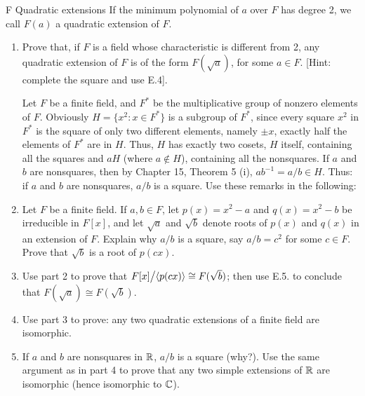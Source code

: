 \begin{exercise}{F Quadratic extensions}
If the minimum polynomial of $a$ over $F$ has degree 2, we call $F(a)$ a quadratic extension of $F$.
\begin{enumerate}
    \item Prove that, if $F$ is a field whose characteristic is different from 2, any quadratic extension of $F$ is of the form $F(\sqrt{a})$, for some $a\in F$. [Hint: complete the square and use E.4].

    Let $F$ be a finite field, and $F^\ast$ be the multiplicative group of nonzero elements of $F$. Obviously $H=\{x^2:x\in F^\ast\}$ is a subgroup of $F^\ast$, since every square $x^2$ in $F^\ast$ is the square of only two different elements, namely $\pm x$, exactly half the elements of $F^\ast$ are in $H$. Thus, $H$ has exactly two cosets, $H$ itself, containing all the squares and $aH$ (where $a\notin H$), containing all the nonsquares. If $a$ and $b$ are nonsquares, then by Chapter 15, Theorem 5 (i), $ab^{-1}=a/b\in H$. Thus: if $a$ and $b$ are nonsquares, $a/b$ is a square. Use these remarks in the following:
    \item Let $F$ be a finite field. If $a,b\in F$, let $p(x)=x^2-a$ and $q(x)=x^2-b$ be irreducible in $F[x]$, and let $\sqrt{a}$ and $\sqrt{b}$ denote roots of $p(x)$ and $q(x)$ in an extension of $F$. Explain why $a/b$ is a square, say $a/b=c^2$ for some $c\in F$. Prove that $\sqrt{b}$ is a root of $p(cx)$.
    \item Use part 2 to prove that ${\textstyle F[x]}\big/{\textstyle \langle p(cx)\rangle}\cong F(\sqrt{b})$; then use E.5. to conclude that $F(\sqrt{a})\cong F(\sqrt{b})$.
    \item Use part 3 to prove: any two quadratic extensions of a finite field are isomorphic.
    \item If $a$ and $b$ are nonsquares in $\mathbb{R}$, $a/b$ is a square (why?). Use the same argument as in part 4 to prove that any two simple extensions of $\mathbb{R}$ are isomorphic (hence isomorphic to $\mathbb{C}$).
\end{enumerate}
\end{exercise}

